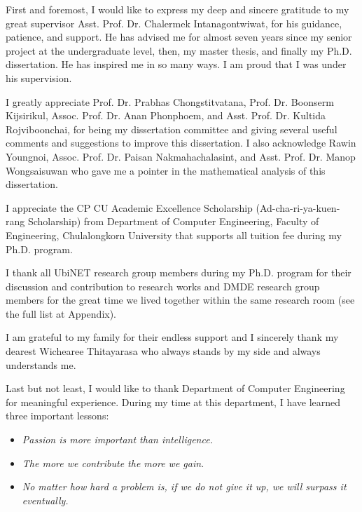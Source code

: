 \begin{acknowledgements}
First and foremost, I would like to express my deep and sincere gratitude to my great supervisor Asst. Prof. Dr. Chalermek Intanagontwiwat, for his guidance, patience, and support.
He has advised me for almost seven years since my senior project at the undergraduate level, then, my master thesis, and finally my Ph.D. dissertation. 
He has inspired me in so many ways. I am proud that I was under his supervision.

I greatly appreciate Prof. Dr. Prabhas Chongstitvatana, Prof. Dr. Boonserm Kijsirikul, Assoc. Prof. Dr. Anan Phonphoem, and Asst. Prof. Dr. Kultida Rojviboonchai, for being my dissertation committee and giving several useful comments and suggestions to improve this dissertation. I also acknowledge Rawin Youngnoi, Assoc. Prof. Dr. Paisan Nakmahachalasint, and Asst. Prof. Dr. Manop Wongsaisuwan who gave me a pointer in the mathematical analysis of this dissertation.
 
 I appreciate the CP CU Academic Excellence Scholarship (Ad-cha-ri-ya-kuen-rang Scholarship) from Department of Computer Engineering, Faculty of Engineering, Chulalongkorn University that supports all tuition fee during my Ph.D. program.

 I thank all UbiNET research group members during my Ph.D. program for their discussion and contribution to research works and DMDE research group members for the great time we lived together within the same research room (see the full list at Appendix).

 I am grateful to my family for their endless support and I sincerely thank my dearest Wichearee Thitayarasa who always stands by my side and always understands me.

Last but not least, I would like to thank Department of Computer Engineering for meaningful experience. During my time at this department, I have learned three important lessons:
 \begin{itemize}
 \item \textit{Passion is more important than intelligence.}
 \item \textit{The more we contribute the more we gain.}
 \item \textit{No matter how hard a problem is, if we do not give it up, we will surpass it eventually.}
 \end{itemize}
\end{acknowledgements}
